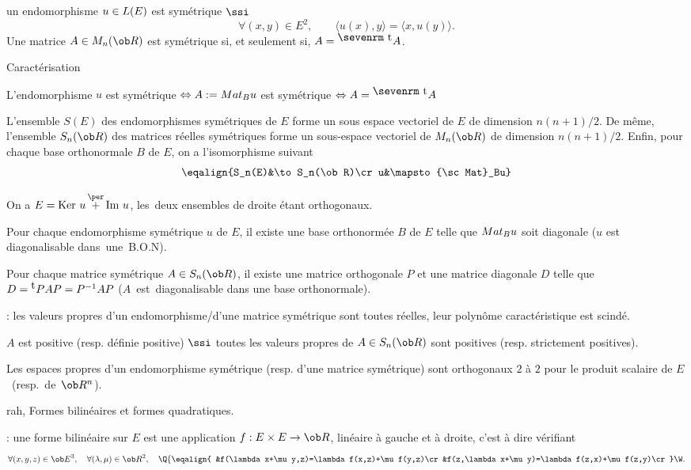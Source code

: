  un endomorphisme $u\in\sc L(E)$ est symétrique $\ssi$
$$
\forall (x,y)\in E^2, \qquad \langle u(x),y\rangle=\langle x,u(y)\rangle. 
$$
Une matrice $A\in\sc M_n(\ob R)$ est symétrique si, et seulement si, 
$A=\null^{\mbox{\sevenrm t}}A$. 
\bigskip

\Concept Caractérisation

L'endomorphisme $u$ est symétrique $\Leftrightarrow A:={\sc Mat}_Bu$ est symétrique $\Leftrightarrow A=\null^{\mbox{\sevenrm t}}A$

\Propriete[$E$ euclidien]
L'ensemble $S(E)$ des endomorphismes symétriques de $E$ forme un sous espace vectoriel de $E$ de dimension 
$n(n+1)/2$. \pn
De même, l'ensemble $S_n(\ob R)$ des matrices réelles symétriques forme un sous-espace vectoriel de $\sc M_n(\ob R)$ de dimension $n(n+1)/2$. 
\pn Enfin, pour chaque base orthonormale $B$ de $E$, on a l'isomorphisme suivant 
$$
\eqalign{S_n(E)&\to S_n(\ob R)\cr u&\mapsto{\sc Mat}_Bu}
$$ 

On a $E=\mbox{Ker\ }u\mathop{+}\limits^\per\mbox{Im\ }u$, les~deux ensembles de droite étant orthogonaux. 
\bigskip

\Theoreme [$E$ euclidien]
Pour chaque endomorphisme symétrique $u$ de $E$, 
il existe une base orthonormée $B$ de $E$ telle que ${\sc Mat}_Bu$ soit diagonale 
($u$ est diagonalisable dans~une~B.O.N). 

\Theoreme [$n\ge1$]
Pour chaque matrice symétrique $A\in S_n(\ob R)$, 
il existe une matrice orthogonale $P$ et une matrice diagonale $D$ telle que 
$D=\null^{\mbox{t}}PAP=P^{-1}AP$ ($A$~est~diagonalisable dans une base orthonormale). 

\Remarque : les valeurs propres d'un endomorphisme/d'une matrice symétrique 
sont toutes réelles, leur polynôme caractéristique est scindé. 
\bigskip

\Definition[$n\ge1$] 
$A$ est positive (resp. définie positive) $\ssi$ toutes les valeurs propres de $A\in S_n(\ob R)$ sont positives (resp. strictement positives).

\Propriete [$E$ euclidien]
Les espaces propres d'un endomorphisme symétrique 
(resp. d'une matrice symétrique) sont orthogonaux $2$ à $2$ 
pour le produit scalaire de $E$~(resp.~de~$\ob R^n$).

\Subsection rah, Formes bilinéaires et formes quadratiques.

\Remarque : une forme bilinéaire sur $E$ est une application $f:E\times E\to\ob R$, 
linéaire à gauche et à droite, c'est à dire vérifiant 
$$
\forall(x,y,z)\in\ob E^3, \quad\forall(\lambda,\mu)\in\ob R^2, \quad\Q\{
\eqalign{
&f(\lambda x+\mu y,z)=\lambda f(x,z)+\mu f(y,z)\cr
&f(z,\lambda x+\mu y)=\lambda f(z,x)+\mu f(z,y)\cr
}
\W.
$$

